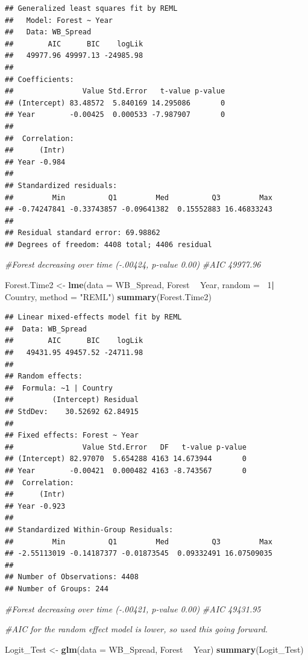 \documentclass[12pt,]{article}
\newenvironment{Shaded}{\begin{snugshade}}{\end{snugshade}}
\newcommand{\KeywordTok}[1]{\textcolor[rgb]{0.13,0.29,0.53}{\textbf{#1}}}
\newcommand{\DataTypeTok}[1]{\textcolor[rgb]{0.13,0.29,0.53}{#1}}
\newcommand{\DecValTok}[1]{\textcolor[rgb]{0.00,0.00,0.81}{#1}}
\newcommand{\StringTok}[1]{\textcolor[rgb]{0.31,0.60,0.02}{#1}}
\newcommand{\CommentTok}[1]{\textcolor[rgb]{0.56,0.35,0.01}{\textit{#1}}}
\newcommand{\OperatorTok}[1]{\textcolor[rgb]{0.81,0.36,0.00}{\textbf{#1}}}
\newcommand{\NormalTok}[1]{#1}
\begin{document}
\begin{verbatim}
## Generalized least squares fit by REML
##   Model: Forest ~ Year 
##   Data: WB_Spread 
##        AIC      BIC    logLik
##   49977.96 49997.13 -24985.98
## 
## Coefficients:
##                Value Std.Error   t-value p-value
## (Intercept) 83.48572  5.840169 14.295086       0
## Year        -0.00425  0.000533 -7.987907       0
## 
##  Correlation: 
##      (Intr)
## Year -0.984
## 
## Standardized residuals:
##         Min          Q1         Med          Q3         Max 
## -0.74247841 -0.33743857 -0.09641382  0.15552883 16.46833243 
## 
## Residual standard error: 69.98862 
## Degrees of freedom: 4408 total; 4406 residual
\end{verbatim}

\begin{Shaded}
\begin{Highlighting}[]
\CommentTok{#Forest decreasing over time (-.00424, p-value 0.00)}
\CommentTok{#AIC 49977.96}

\NormalTok{Forest.Time2 <-}\StringTok{ }\KeywordTok{lme}\NormalTok{(}\DataTypeTok{data =}\NormalTok{ WB_Spread,}
\NormalTok{                Forest }\OperatorTok{~}\StringTok{ }\NormalTok{Year,}
                \DataTypeTok{random =} \OperatorTok{~}\DecValTok{1}\OperatorTok{|}\StringTok{ }\NormalTok{Country,}
                \DataTypeTok{method =} \StringTok{"REML"}\NormalTok{)}
\KeywordTok{summary}\NormalTok{(Forest.Time2)}
\end{Highlighting}
\end{Shaded}

\begin{verbatim}
## Linear mixed-effects model fit by REML
##  Data: WB_Spread 
##        AIC      BIC    logLik
##   49431.95 49457.52 -24711.98
## 
## Random effects:
##  Formula: ~1 | Country
##         (Intercept) Residual
## StdDev:    30.52692 62.84915
## 
## Fixed effects: Forest ~ Year 
##                Value Std.Error   DF   t-value p-value
## (Intercept) 82.97070  5.654288 4163 14.673944       0
## Year        -0.00421  0.000482 4163 -8.743567       0
##  Correlation: 
##      (Intr)
## Year -0.923
## 
## Standardized Within-Group Residuals:
##         Min          Q1         Med          Q3         Max 
## -2.55113019 -0.14187377 -0.01873545  0.09332491 16.07509035 
## 
## Number of Observations: 4408
## Number of Groups: 244
\end{verbatim}

\begin{Shaded}
\begin{Highlighting}[]
\CommentTok{#Forest decreasing over time (-.00421, p-value 0.00)}
\CommentTok{#AIC 49431.95}

\CommentTok{#AIC for the random effect model is lower, so used this going forward. }

\NormalTok{Logit_Test <-}\StringTok{ }\KeywordTok{glm}\NormalTok{(}\DataTypeTok{data =}\NormalTok{ WB_Spread,}
\NormalTok{             Forest }\OperatorTok{~}\StringTok{ }\NormalTok{Year)}
\KeywordTok{summary}\NormalTok{(Logit_Test)}
\end{Highlighting}
\end{Shaded}
\end{document}
